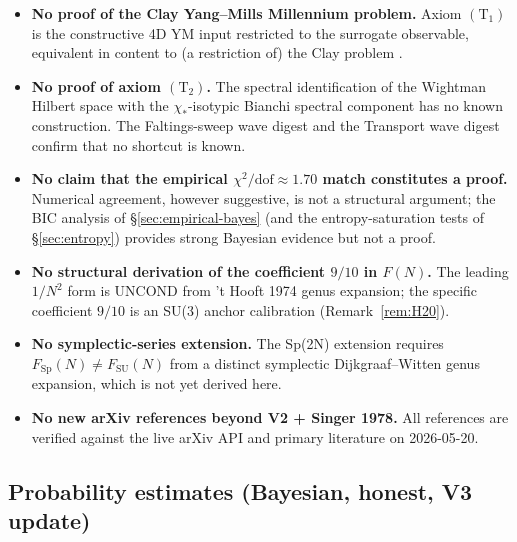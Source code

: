 \documentclass[11pt,a4paper,reqno]{amsart}
\theoremstyle{definition}
\DeclareMathOperator{\SU}{SU}
\DeclareMathOperator{\Sp}{Sp}
\newcommand{\Cone}{(\mathrm{T}_{1})}
\newcommand{\Ctwo}{(\mathrm{T}_{2})}
\begin{document}
\begin{itemize}[leftmargin=2em]
   \item \textbf{No proof of the Clay Yang--Mills Millennium problem.}
         Axiom $\Cone$ is the constructive 4D YM input restricted to
         the surrogate observable, equivalent in content to (a
         restriction of) the Clay problem
         \cite{JaffeWitten2000}.
   \item \textbf{No proof of axiom $\Ctwo$.} The spectral
         identification of the Wightman Hilbert space with the
         $\chi_*$-isotypic Bianchi spectral component has no known
         construction. The Faltings-sweep wave digest
         \cite{Remondiere2026FaltingsLLZDigest} and the Transport
         wave digest \cite{Remondiere2026TransportWaveDigest} confirm
         that no shortcut is known.
   \item \textbf{No claim that the empirical $\chi^2/\text{dof}\approx
         1.70$ match constitutes a proof.} Numerical agreement,
         however suggestive, is not a structural argument; the BIC
         analysis of \S\ref{sec:empirical-bayes} (and the
         entropy-saturation tests of \S\ref{sec:entropy}) provides
         strong Bayesian evidence but not a proof.
   \item \textbf{No structural derivation of the coefficient $9/10$
         in $F(N)$.} The leading $1/N^2$ form is UNCOND from
         't Hooft 1974 genus expansion; the specific coefficient
         $9/10$ is an SU(3) anchor calibration
         (Remark~\ref{rem:H20}).
   \item \textbf{No symplectic-series extension.} The Sp(2N)
         extension requires $F_{\Sp}(N)\ne F_{\SU}(N)$ from a
         distinct symplectic Dijkgraaf--Witten genus expansion,
         which is not yet derived here.
   \item \textbf{No new arXiv references beyond V2 + Singer 1978.}
         All references are verified against the live arXiv API
         and primary literature on 2026-05-20.
\end{itemize}

\subsection{Probability estimates (Bayesian, honest, V3 update)}\label{ss:proba}
\end{document}
